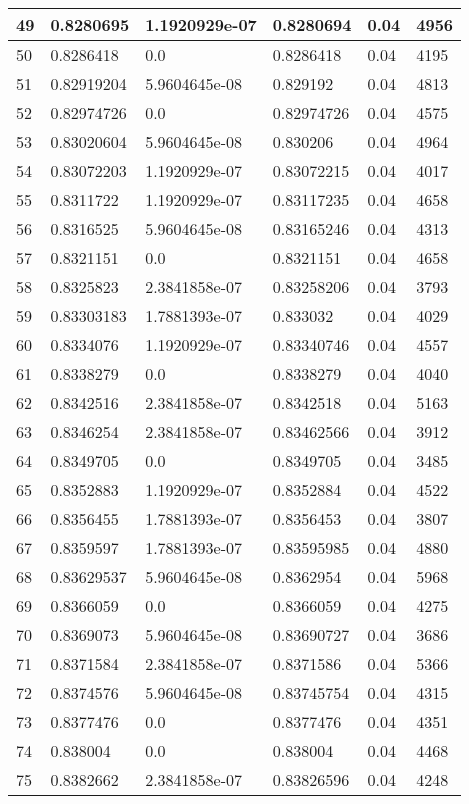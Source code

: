 \begin{longtable}{|l|l|l|l|l|l|}
49 & 0.8280695 & 1.1920929e-07 & 0.8280694 & 0.04 & 4956 \\ \hline 
50 & 0.8286418 & 0.0 & 0.8286418 & 0.04 & 4195 \\ \hline 
51 & 0.82919204 & 5.9604645e-08 & 0.829192 & 0.04 & 4813 \\ \hline 
52 & 0.82974726 & 0.0 & 0.82974726 & 0.04 & 4575 \\ \hline 
53 & 0.83020604 & 5.9604645e-08 & 0.830206 & 0.04 & 4964 \\ \hline 
54 & 0.83072203 & 1.1920929e-07 & 0.83072215 & 0.04 & 4017 \\ \hline 
55 & 0.8311722 & 1.1920929e-07 & 0.83117235 & 0.04 & 4658 \\ \hline 
56 & 0.8316525 & 5.9604645e-08 & 0.83165246 & 0.04 & 4313 \\ \hline 
57 & 0.8321151 & 0.0 & 0.8321151 & 0.04 & 4658 \\ \hline 
58 & 0.8325823 & 2.3841858e-07 & 0.83258206 & 0.04 & 3793 \\ \hline 
59 & 0.83303183 & 1.7881393e-07 & 0.833032 & 0.04 & 4029 \\ \hline 
60 & 0.8334076 & 1.1920929e-07 & 0.83340746 & 0.04 & 4557 \\ \hline 
61 & 0.8338279 & 0.0 & 0.8338279 & 0.04 & 4040 \\ \hline 
62 & 0.8342516 & 2.3841858e-07 & 0.8342518 & 0.04 & 5163 \\ \hline 
63 & 0.8346254 & 2.3841858e-07 & 0.83462566 & 0.04 & 3912 \\ \hline 
64 & 0.8349705 & 0.0 & 0.8349705 & 0.04 & 3485 \\ \hline 
65 & 0.8352883 & 1.1920929e-07 & 0.8352884 & 0.04 & 4522 \\ \hline 
66 & 0.8356455 & 1.7881393e-07 & 0.8356453 & 0.04 & 3807 \\ \hline 
67 & 0.8359597 & 1.7881393e-07 & 0.83595985 & 0.04 & 4880 \\ \hline 
68 & 0.83629537 & 5.9604645e-08 & 0.8362954 & 0.04 & 5968 \\ \hline 
69 & 0.8366059 & 0.0 & 0.8366059 & 0.04 & 4275 \\ \hline 
70 & 0.8369073 & 5.9604645e-08 & 0.83690727 & 0.04 & 3686 \\ \hline 
71 & 0.8371584 & 2.3841858e-07 & 0.8371586 & 0.04 & 5366 \\ \hline 
72 & 0.8374576 & 5.9604645e-08 & 0.83745754 & 0.04 & 4315 \\ \hline 
73 & 0.8377476 & 0.0 & 0.8377476 & 0.04 & 4351 \\ \hline 
74 & 0.838004 & 0.0 & 0.838004 & 0.04 & 4468 \\ \hline 
75 & 0.8382662 & 2.3841858e-07 & 0.83826596 & 0.04 & 4248 \\ \hline 
\end{longtable}